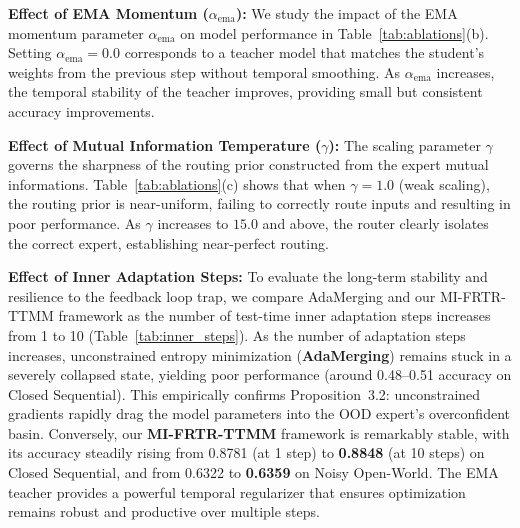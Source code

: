 \documentclass{article}
\theoremstyle{plain}
\theoremstyle{definition}
\theoremstyle{remark}
\begin{document}
\textbf{Effect of EMA Momentum ($\alpha_{\text{ema}}$):}
We study the impact of the EMA momentum parameter $\alpha_{\text{ema}}$ on model performance in Table~\ref{tab:ablations}(b). Setting $\alpha_{\text{ema}}=0.0$ corresponds to a teacher model that matches the student's weights from the previous step without temporal smoothing. As $\alpha_{\text{ema}}$ increases, the temporal stability of the teacher improves, providing small but consistent accuracy improvements.

\textbf{Effect of Mutual Information Temperature ($\gamma$):}
The scaling parameter $\gamma$ governs the sharpness of the routing prior constructed from the expert mutual informations. Table~\ref{tab:ablations}(c) shows that when $\gamma=1.0$ (weak scaling), the routing prior is near-uniform, failing to correctly route inputs and resulting in poor performance. As $\gamma$ increases to $15.0$ and above, the router clearly isolates the correct expert, establishing near-perfect routing.

\textbf{Effect of Inner Adaptation Steps:}
To evaluate the long-term stability and resilience to the feedback loop trap, we compare AdaMerging and our MI-FRTR-TTMM framework as the number of test-time inner adaptation steps increases from 1 to 10 (Table~\ref{tab:inner_steps}). As the number of adaptation steps increases, unconstrained entropy minimization (\textbf{AdaMerging}) remains stuck in a severely collapsed state, yielding poor performance (around 0.48--0.51 accuracy on Closed Sequential). This empirically confirms Proposition~3.2: unconstrained gradients rapidly drag the model parameters into the OOD expert's overconfident basin. Conversely, our \textbf{MI-FRTR-TTMM} framework is remarkably stable, with its accuracy steadily rising from 0.8781 (at 1 step) to \textbf{0.8848} (at 10 steps) on Closed Sequential, and from 0.6322 to \textbf{0.6359} on Noisy Open-World. The EMA teacher provides a powerful temporal regularizer that ensures optimization remains robust and productive over multiple steps.
\end{document}
